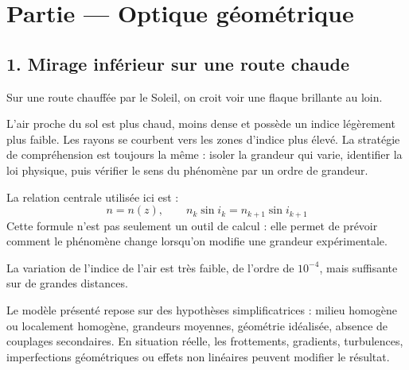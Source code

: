\documentclass[11pt,a4paper]{article}
\begin{document}
\section{Partie — Optique géométrique}


\subsection{1. Mirage inférieur sur une route chaude}

\begin{exemplebox}
Sur une route chauffée par le Soleil, on croit voir une flaque brillante au loin.
\end{exemplebox}

\begin{methodebox}
L'air proche du sol est plus chaud, moins dense et possède un indice légèrement plus faible. Les rayons se courbent vers les zones d'indice plus élevé.
La stratégie de compréhension est toujours la même : isoler la grandeur qui varie, identifier la loi physique, puis vérifier le sens du phénomène par un ordre de grandeur.
\end{methodebox}

\begin{theorembox}
La relation centrale utilisée ici est :
\[
n=n(z),\qquad n_k\sin i_k=n_{k+1}\sin i_{k+1}
\]
Cette formule n'est pas seulement un outil de calcul : elle permet de prévoir comment le phénomène change lorsqu'on modifie une grandeur expérimentale.
\end{theorembox}

\begin{odgbox}
La variation de l'indice de l'air est très faible, de l'ordre de $10^{-4}$, mais suffisante sur de grandes distances.
\end{odgbox}

\begin{attentionbox}
Le modèle présenté repose sur des hypothèses simplificatrices : milieu homogène ou localement homogène, grandeurs moyennes, géométrie idéalisée, absence de couplages secondaires. En situation réelle, les frottements, gradients, turbulences, imperfections géométriques ou effets non linéaires peuvent modifier le résultat.
\end{attentionbox}
\end{document}
